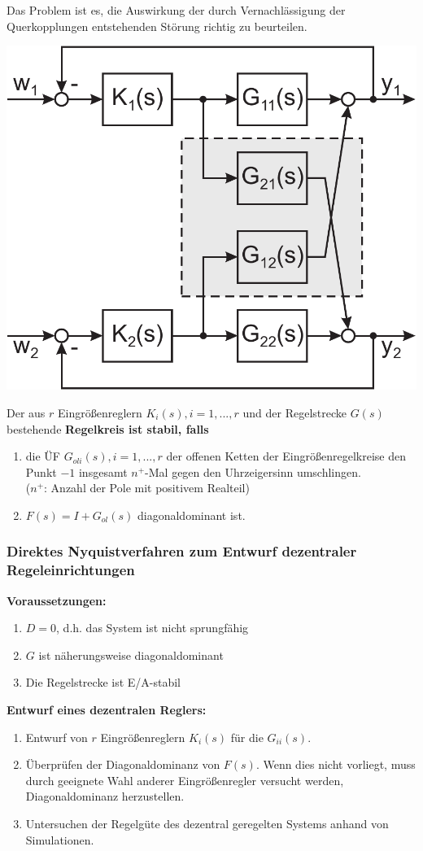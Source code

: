 \documentclass[a4paper,twocolumn,10pt]{article}
\begin{document}
Das Problem ist es, die Auswirkung der durch Vernachlässigung der Querkopplungen entstehenden Störung richtig zu beurteilen.
\begin{center}
\includegraphics[width=0.9\columnwidth]{Grafiken/Dezentraler_Regler_Querkopplungen}
\end{center}
Der aus $r$ Eingrößenreglern $K_i(s),i=1,...,r$ und der Regelstrecke $G(s)$ bestehende \textbf{Regelkreis ist stabil, falls}
\begin{enumerate}[label=$\bullet$]
\item die ÜF $G_{oli}(s),i=1,...,r$ der offenen Ketten der Eingrößenregelkreise den Punkt $-1$ insgesamt $n^+$-Mal gegen den Uhrzeigersinn umschlingen.\\
($n^+$: Anzahl der Pole mit positivem Realteil)
\item $F(s)=I+G_{ol}(s)$ diagonaldominant ist.
\end{enumerate}

\subsubsection{Direktes Nyquistverfahren zum Entwurf dezentraler Regeleinrichtungen}
\textbf{Voraussetzungen:}
\begin{enumerate}[label=$\bullet$]
\item $D=0$, d.h. das System ist nicht sprungfähig
\item $G$ ist näherungsweise diagonaldominant
\item Die Regelstrecke ist E/A-stabil
\end{enumerate}
\textbf{Entwurf eines dezentralen Reglers:}
\begin{enumerate}
\item Entwurf von $r$ Eingrößenreglern $K_i(s)$ für die $G_{ii}(s)$.
\item Überprüfen der Diagonaldominanz von $F(s)$. Wenn dies nicht vorliegt, muss durch geeignete Wahl anderer Eingrößenregler versucht werden, Diagonaldominanz herzustellen.
\item Untersuchen der Regelgüte des dezentral geregelten Systems anhand von Simulationen.
\end{enumerate}
\end{document}
